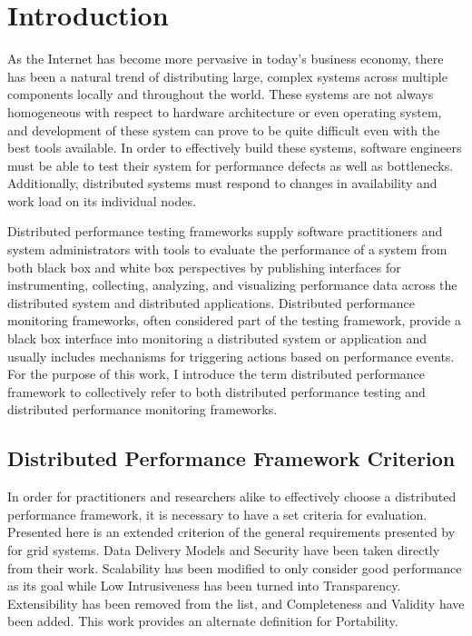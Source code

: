 \chapter{Introduction}
\label{introduction}

As the Internet has become more pervasive in today's business economy, there has been a natural trend of distributing
large, complex systems across multiple components locally and throughout the world. These systems are not always
homogeneous with respect to hardware architecture or even operating system, and development of these system can prove to
be quite difficult even with the best tools available. In order to effectively build these systems, software engineers
must be able to test their system for performance defects as well as bottlenecks. Additionally, distributed systems must
respond to changes in availability and work load on its individual nodes.

Distributed performance testing frameworks supply software practitioners and system administrators with tools to
evaluate the performance of a system from both black box and white box perspectives by publishing interfaces for
instrumenting, collecting, analyzing, and visualizing performance data across the distributed system and distributed
applications. Distributed performance monitoring frameworks, often considered part of the testing framework, provide a
black box interface into monitoring a distributed system or application and usually includes mechanisms for triggering
actions based on performance events. For the purpose of this work, I introduce the term distributed performance
framework to collectively refer to both distributed performance testing and distributed performance monitoring
frameworks.

\section{Distributed Performance Framework Criterion}

In order for practitioners and researchers alike to effectively choose a distributed performance framework, it is
necessary to have a set criteria for evaluation. Presented here is an extended criterion of the general requirements
presented by \cite{zanikolas2005} for grid systems. Data Delivery Models and Security have been taken directly from
their work. Scalability has been modified to only consider good performance as its goal while Low Intrusiveness has been
turned into Transparency. Extensibility has been removed from the list, and Completeness and Validity have been added.
This work provides an alternate definition for Portability.

